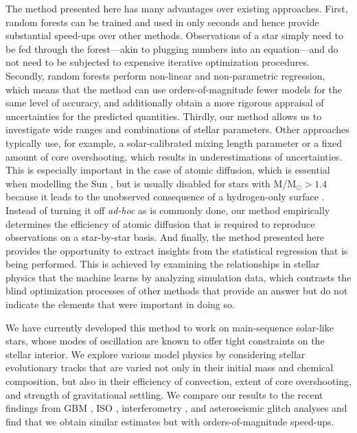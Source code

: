 \documentclass[twocolumn,twocolappendix]{aastex6}
\begin{document}
The method presented here has many advantages over existing approaches. First, random forests can be trained and used in only seconds and hence provide substantial speed-ups over other methods. Observations of a star simply need to be fed through the forest---akin to plugging numbers into an equation---and do not need to be subjected to expensive iterative optimization procedures. 
Secondly, random forests perform non-linear and non-parametric regression, which means that the method can use orders-of-magnitude fewer models for the same level of accuracy, and additionally obtain a more rigorous appraisal of uncertainties for the predicted quantities. 
Thirdly, our method allows us to investigate wide ranges and combinations of stellar parameters. Other approaches typically use, for example, a solar-calibrated mixing length parameter or a fixed amount of core overshooting, which results in underestimations of uncertainties. This is especially important in the case of atomic diffusion, which is essential when modelling the Sun \citep[see e.g.][]{1994MNRAS.269.1137B}, but is usually disabled for stars with M/M$_\odot > 1.4$ because it leads to the unobserved consequence of a hydrogen-only surface \citep{2002A&A...390..611M}. Instead of turning it off \emph{ad-hoc} as is commonly done, our method empirically determines the efficiency of atomic diffusion that is required to reproduce observations on a star-by-star basis. 
And finally, the method presented here provides the opportunity to extract insights from the statistical regression that is being performed. This is achieved by examining the relationships in stellar physics that the machine learns by analyzing simulation data, which contrasts the blind optimization processes of other methods that provide an answer but do not indicate the elements that were important in doing so. 

We have currently developed this method to work on main-sequence solar-like stars, whose modes of oscillation are known to offer tight constraints on the stellar interior. We explore various model physics by considering stellar evolutionary tracks that are varied not only in their initial mass and chemical composition, but also in their efficiency of convection, extent of core overshooting, and strength of gravitational settling. We compare our results to the recent findings from GBM \citep{2015MNRAS.452.2127S}, ISO \citep{2015ApJ...811L..37M}, interferometry \citep{2013MNRAS.433.1262W}, and asteroseismic glitch analyses \citep{2014ApJ...790..138V} and find that we obtain similar estimates but with orders-of-magnitude speed-ups. 
\end{document}
